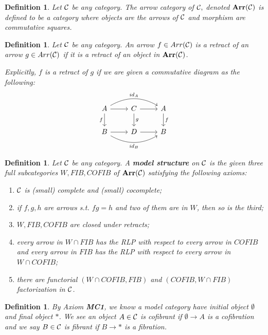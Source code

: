 \documentclass[11pt]{article}
\newtheorem{dfn}[thm]{Definition}
\newcommand{\calc}{{\cal C}}
\newcommand{\lrta}{\longrightarrow}
\begin{document}
\begin{dfn}
Let $\calc$ be any category. The arrow category of $\calc,$ denoted $\mathbf{Arr}(\calc)$ is defined to be a category where objects are the arrows of $\calc$ and morphism are commutative squares.
\end{dfn}

\begin{dfn}
Let $\calc$ be any category. An arrow $f\in Arr(\calc)$ is a retract of an arrow $g\in Arr(\calc)$ if it is a retract of an object in $\mathbf{Arr}(\calc)$.

Explicitly, $f$ is a retract of $g$ if we are given a commutative diagram as the following:
$$
\begin{tikzcd}
A \arrow[r] \arrow[rr, "id_A", bend left] \arrow[d, "f"'] & C \arrow[r] \arrow[d, "g"] & A \arrow[d, "f"] \\
B \arrow[r] \arrow[rr, "id_B"', bend right] & D \arrow[r] & B
\end{tikzcd}
$$
\end{dfn}

\begin{dfn}
Let $\calc$ be any category. A \textbf{model structure} on $\calc$ is  the given three full subcategories $W, FIB, COFIB$ of $\mathbf{Arr}(\calc)$ satisfying the following axioms:
\begin{enumerate}[label=\textbf{MC\arabic*}]
\item $\calc$ is (small) complete and (small) cocomplete;
\item if $f,g,h$ are arrows s.t. $fg=h$ and two of them are in $W$, then so is the third;
\item $W,FIB,COFIB$ are closed under retracts;
\item every arrow in $W\cap FIB$ has the RLP with respect to every arrow in $COFIB$ and every arrow in $FIB$ has the RLP with respect to every arrow in $W\cap COFIB$;
\item there are functorial $(W\cap COFIB, FIB)$ and $(COFIB,W\cap FIB)$ factorization in $\calc$.
\end{enumerate}
\end{dfn}

\begin{dfn}
By Axiom \textbf{MC1}, we know a model category have initial object $\emptyset$ and final object $*$. We see an object $A\in \calc$ is cofibrant if $\emptyset\lrta A$ is a cofibration and we say $B\in\calc$ is fibrant if $B\lrta *$ is a fibration.
\end{dfn}
\end{document}
